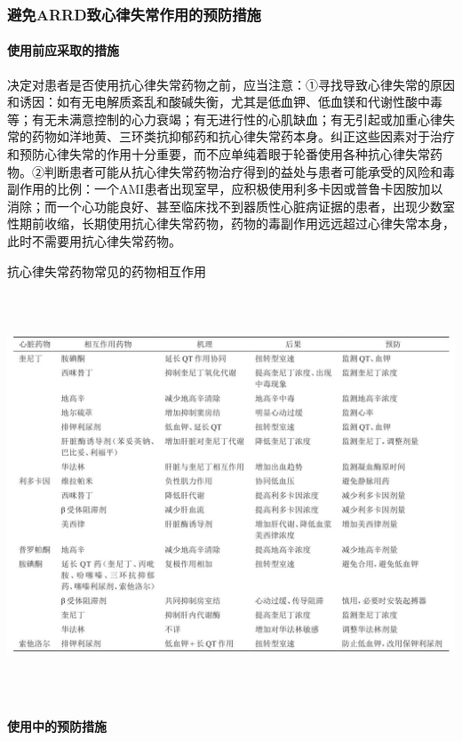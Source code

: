 \subsubsection{避免ARRD致心律失常作用的预防措施}

\paragraph{使用前应采取的措施}

决定对患者是否使用抗心律失常药物之前，应当注意：①寻找导致心律失常的原因和诱因：如有无电解质紊乱和酸碱失衡，尤其是低血钾、低血镁和代谢性酸中毒等；有无未满意控制的心力衰竭；有无进行性的心肌缺血；有无引起或加重心律失常的药物如洋地黄、三环类抗抑郁药和抗心律失常药本身。纠正这些因素对于治疗和预防心律失常的作用十分重要，而不应单纯着眼于轮番使用各种抗心律失常药物。②判断患者可能从抗心律失常药物治疗得到的益处与患者可能承受的风险和毒副作用的比例：一个AMI患者出现室早，应积极使用利多卡因或普鲁卡因胺加以消除；而一个心功能良好、甚至临床找不到器质性心脏病证据的患者，出现少数室性期前收缩，长期使用抗心律失常药物，药物的毒副作用远远超过心律失常本身，此时不需要用抗心律失常药物。

\begin{table}[htbp]
\centering
\caption{抗心律失常药物常见的药物相互作用}
\label{tab151-6}
\includegraphics[width=6.625in,height=4.73958in]{./images/Image00575.jpg}
\end{table}

\paragraph{使用中的预防措施}


